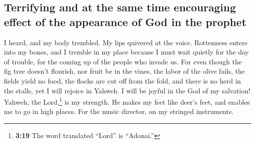 \hypertarget{terrifying-and-at-the-same-time-encouraging-effect-of-the-appearance-of-god-in-the-prophet}{%
\subsection{Terrifying and at the same time encouraging effect of the
appearance of God in the
prophet}\label{terrifying-and-at-the-same-time-encouraging-effect-of-the-appearance-of-god-in-the-prophet}}

 I heard, and my body trembled. My lips quivered at the
voice. Rottenness enters into my bones, and I tremble in my place
because I must wait quietly for the day of trouble, for the coming up of
the people who invade us.  For even though the fig tree
doesn't flourish, nor fruit be in the vines, the labor of the olive
fails, the fields yield no food, the flocks are cut off from the fold,
and there is no herd in the stalls,  yet I will rejoice
in Yahweh. I will be joyful in the God of my salvation! 
Yahweh, the Lord,\footnote{\textbf{3:19} The word translated ``Lord'' is
  ``Adonai.''} is my strength. He makes my feet like deer's feet, and
enables me to go in high places. For the music director, on my stringed
instruments.

